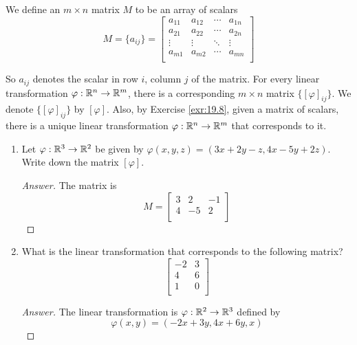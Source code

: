 \documentclass[../main.tex]{subfiles}
\begin{document}
\begin{definition}\label{dfn:19.9}
    We define an $m\times n$ matrix $M$ to be an array of scalars
    \begin{equation*}
        M = \{a_{ij}\} =
        \begin{bmatrix}
            a_{11} & a_{12} & \cdots & a_{1n}\\
            a_{21} & a_{22} & \cdots & a_{2n}\\
            \vdots & \vdots & \ddots & \vdots\\
            a_{m1} & a_{m2} & \cdots & a_{mn}\\
        \end{bmatrix}
    \end{equation*}
\end{definition}

So $a_{ij}$ denotes the scalar in row $i$, column $j$ of the matrix. For every linear transformation $\varphi:\mathbb{R}^n\to\mathbb{R}^m$, there is a corresponding $m\times n$ matrix $\{[\varphi]_{ij}\}$. We denote $\{[\varphi]_{ij}\}$ by $[\varphi]$. Also, by Exercise \ref{exr:19.8}, given a matrix of scalars, there is a unique linear transformation $\varphi:\mathbb{R}^n\to\mathbb{R}^m$ that corresponds to it.

\begin{exercise}\label{exr:19.10}\leavevmode
    \begin{enumerate}[label={(\alph*)}]
        \item Let $\varphi:\mathbb{R}^3\to\mathbb{R}^2$ be given by $\varphi(x,y,z)=(3x+2y-z,4x-5y+2z)$. Write down the matrix $[\varphi]$.
        \begin{proof}[Answer]
            The matrix is
            \begin{equation*}
                M =
                \begin{bmatrix}
                    3 & 2 & -1\\
                    4 & -5 & 2\\
                \end{bmatrix}
            \end{equation*}
        \end{proof}
        \item What is the linear transformation that corresponds to the following matrix?
        \begin{equation*}
            \begin{bmatrix}
                -2 & 3\\
                4 & 6\\
                1 & 0\\
            \end{bmatrix}
        \end{equation*}
        \begin{proof}[Answer]
            The linear transformation is $\varphi:\mathbb{R}^2\to\mathbb{R}^3$ defined by
            \begin{equation*}
                \varphi(x,y) = (-2x+3y,4x+6y,x)
            \end{equation*}
        \end{proof}
    \end{enumerate}
\end{exercise}
\end{document}
